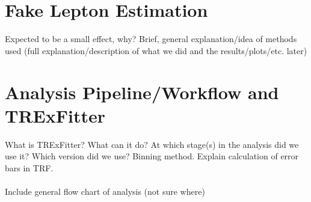 \section{Fake Lepton Estimation} 
Expected to be a small effect, why? Brief, general explanation/idea of methods used (full explanation/description of what we did and the results/plots/etc. later) 
\section{Analysis Pipeline/Workflow and TRExFitter}
What is TRExFitter? What can it do? At which stage(s) in the analysis did we use it? Which version did we use? Binning method. Explain calculation of error bars in TRF. \\\\ 
Include general flow chart of analysis (not sure where)

